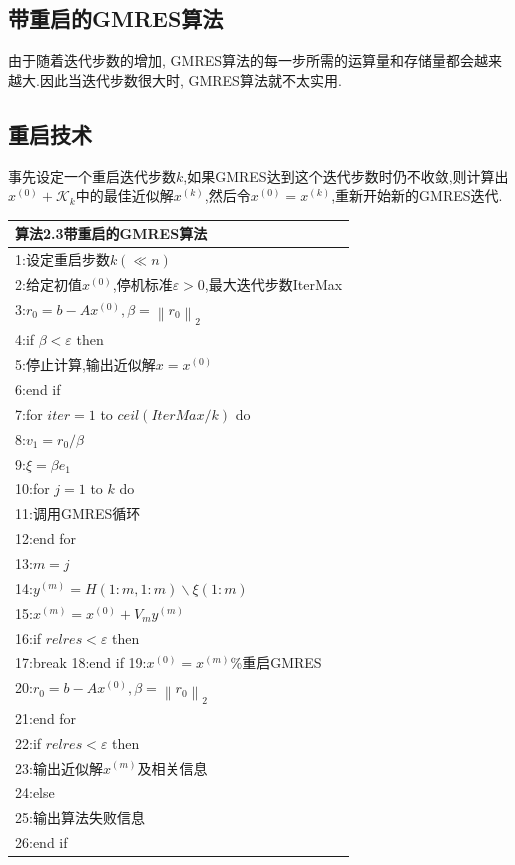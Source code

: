 \documentclass[12pt,a4paper]{article}
\begin{document}
\subsection*{带重启的GMRES算法}
由于随着迭代步数的增加, GMRES算法的每一步所需的运算量和存储量都会越来越大.因此当迭代步数很大时, GMRES算法就不太实用.
\subsection*{\color{blue}重启技术}
事先设定一个重启迭代步数$k$,如果GMRES达到这个迭代步数时仍不收敛,则计算出$x^{(0)}+\mathcal{K}_{k}$中的最佳近似解$x^{(k)}$,然后令$x^{(0)}=x^{(k)}$,重新开始新的GMRES迭代.\\
\begin{tabular}{l}
	\hline
	{\color{blue}算法2.3}带重启的GMRES算法\\
	\hline
	1:设定重启步数$k(\ll n )$\\
	2:给定初值$x^{(0)}$,停机标准$\varepsilon>0$,最大迭代步数IterMax\\
	3:$r_{0}=b-A x^{(0)}, \beta=\left\|r_{0}\right\|_{2}$\\
	4:if $\beta<\varepsilon$ then\\
	5:\qquad 停止计算,输出近似解$x=x^{(0)}$\\
	6:end if\\
	7:for $iter=1$ to $ceil(IterMax/k)$ do\\
	8:\qquad $v_{1}=r_{0} / \beta$\\
	9:\qquad $\xi=\beta e_{1}$\\
	10:\qquad for $j= 1$ to $k$ do\\
	11:\qquad \qquad 调用GMRES循环\\
	12:\qquad end for \\
	13:\qquad $m=j$\\
	14:\qquad $y^{(m)}=H(1 : m, 1 : m) \backslash \xi(1 : m)$\\
	15:\qquad $x^{(m)}=x^{(0)}+V_{m} y^{(m)}$\\
	16:\qquad if $relres<\varepsilon$ then \qquad {\color{red}\%收敛。退出循环}\\
	17:\qquad \qquad break
	18:\qquad end if
	19:\qquad $x^{(0)}=x^{(m)}${\color{red}\%重启GMRES}\\
	20:\qquad $r_{0}=b-A x^{(0)}, \beta=\left\|r_{0}\right\|_{2}$\\
	21:end for \\
	22:if $relres<\varepsilon$ then\\
	23:\qquad 输出近似解$x^{(m)}$及相关信息\\
	24:else\\
	25:\qquad 输出算法失败信息\\
	26:end if\\
	\hline
\end{tabular}
\end{document}
